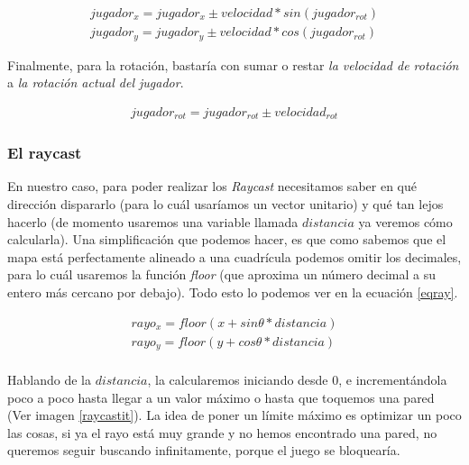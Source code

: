 \begin{equation}
\begin{aligned}
\label{movforw}
jugador_x = jugador_x \pm velocidad * sin(jugador_{rot})  \\
jugador_y = jugador_y \pm velocidad * cos(jugador_{rot})
\end{aligned}
\end{equation}

Finalmente, para la rotación, bastaría con sumar o restar \emph{la velocidad de rotación} a \emph{la rotación actual del jugador}.

\begin{equation}
\begin{aligned}
\label{eq-rot}
jugador_{rot} = jugador_{rot} \pm velocidad_{rot}
\end{aligned}
\end{equation}





\subsubsection{El raycast}

En nuestro caso, para poder realizar los \emph{Raycast} necesitamos saber en qué dirección dispararlo (para lo cuál usaríamos un vector unitario) y qué tan lejos hacerlo (de momento usaremos una variable llamada $distancia$ ya veremos cómo calcularla). Una simplificación que podemos hacer, es que como sabemos que el mapa está perfectamente alineado a una cuadrícula podemos omitir los decimales, para lo cuál usaremos la función \emph{floor} (que aproxima un número decimal a su entero más cercano por debajo). Todo esto lo podemos ver en la ecuación \ref{eqray}.

\begin{equation}
\begin{aligned}
\label{eqray}
rayo_x = floor(x + sin \theta * distancia)\\
rayo_y = floor(y + cos \theta * distancia)\\
\end{aligned}
\end{equation}

Hablando de la $distancia$, la calcularemos iniciando desde 0, e incrementándola poco a poco hasta llegar a un valor máximo o hasta que toquemos una pared (Ver imagen \ref{raycastit}). La idea de poner un límite máximo es optimizar un poco las cosas, si ya el rayo está muy grande y no hemos encontrado una pared, no queremos seguir buscando infinitamente, porque el juego se bloquearía.

